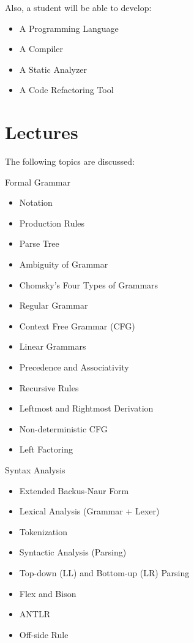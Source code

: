 \documentclass[nobrand,anonymous,nodate,nosecurity]{huawei}
\begin{document}
{Also, a student will be able to develop:

\begin{itemize}
\item A Programming Language
\item A Compiler
\item A Static Analyzer
\item A Code Refactoring Tool
\end{itemize}

\newpage
\section*{Lectures}

The following topics are discussed:

\begin{lectures}
\item Formal Grammar
	\begin{itemize}
	\item Notation
	\item Production Rules
	\item Parse Tree
	\item Ambiguity of Grammar
	\item Chomsky's Four Types of Grammars
	\item Regular Grammar
	\item Context Free Grammar (CFG)
	\item Linear Grammars
	\item Precedence and Associativity
	\item Recursive Rules
	\item Leftmost and Rightmost Derivation
	\item Non-deterministic CFG
	\item Left Factoring
	\end{itemize}
\item Syntax Analysis
	\begin{itemize}
	\item Extended Backus-Naur Form
	\item Lexical Analysis (Grammar + Lexer)
	\item Tokenization
	\item Syntactic Analysis (Parsing)
	\item Top-down (LL) and Bottom-up (LR) Parsing
	\item Flex and Bison
	\item ANTLR
	\item Off-side Rule

\end{itemize}
\end{lectures}}
\end{document}
